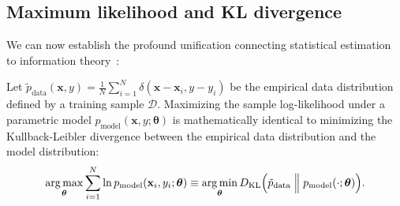 \subsection{Maximum likelihood and KL divergence}
\label{sec:mle_kl_equivalence}

We can now establish the profound unification connecting statistical estimation to information theory~\cite{goodfellow2016deep,bishop2024deep}:
\begin{theorem}
Let $\tilde{p}_{\text{data}}(\mathbf{x}, y) = \frac{1}{N}\sum_{i=1}^N \delta(\mathbf{x} - \mathbf{x}_i, y - y_i)$ be the empirical data distribution defined by a training sample $\mathcal{D}$. Maximizing the sample log-likelihood under a parametric model $p_{\text{model}}(\mathbf{x}, y; \boldsymbol{\theta})$ is mathematically identical to minimizing the Kullback-Leibler divergence between the empirical data distribution and the model distribution:
\begin{equation}
\operatorname*{arg\,max}_{\boldsymbol{\theta}} \sum_{i=1}^N \ln p_{\text{model}}(\mathbf{x}_i, y_i; \boldsymbol{\theta}) \equiv \operatorname*{arg\,min}_{\boldsymbol{\theta}} D_{\text{KL}}\Big( \tilde{p}_{\text{data}} \;\Big\|\; p_{\text{model}}(\cdot; \boldsymbol{\theta}) \Big).
\label{eq:mle_kl_equivalence}
\end{equation}
\end{theorem}

